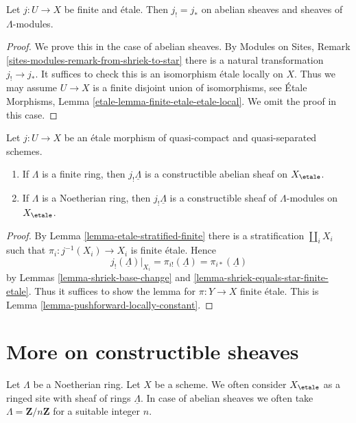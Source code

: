 \begin{lemma}
\label{lemma-shriek-equals-star-finite-etale}
Let $j : U \to X$ be finite and \'etale. Then $j_! = j_*$
on abelian sheaves and sheaves of $\Lambda$-modules.
\end{lemma}

\begin{proof}
We prove this in the case of abelian sheaves.
By Modules on Sites, Remark \ref{sites-modules-remark-from-shriek-to-star}
there is a natural transformation $j_! \to j_*$.
It suffices to check this is an isomorphism \'etale locally
on $X$. Thus we may assume $U \to X$ is a finite disjoint union
of isomorphisms, see
\'Etale Morphisms, Lemma \ref{etale-lemma-finite-etale-etale-local}.
We omit the proof in this case.
\end{proof}

\begin{lemma}
\label{lemma-jshriek-constructible}
Let $j : U \to X$ be an \'etale morphism of quasi-compact and
quasi-separated schemes.
\begin{enumerate}
\item If $\Lambda$ is a finite ring, then $j_!\underline{\Lambda}$ is a
constructible abelian sheaf on $X_\etale$.
\item If $\Lambda$ is a Noetherian ring, then $j_!\underline{\Lambda}$ is a
constructible sheaf of $\Lambda$-modules on $X_\etale$.
\end{enumerate}
\end{lemma}

\begin{proof}
By Lemma \ref{lemma-etale-stratified-finite} there is a stratification
$\coprod_i X_i$ such that $\pi_i: j^{-1}(X_i) \to X_i$ is finite \'etale.
Hence
$$
j_!(\underline{\Lambda})|_{X_i} =
\pi_{i!}(\underline{\Lambda}) =
\pi_{i*}(\underline{\Lambda})
$$
by Lemmas \ref{lemma-shriek-base-change} and
\ref{lemma-shriek-equals-star-finite-etale}.
Thus it suffices to show the lemma for $\pi : Y \to X$ finite \'etale.
This is Lemma \ref{lemma-pushforward-locally-constant}.
\end{proof}








\section{More on constructible sheaves}
\label{section-more-constructible}

\noindent
Let $\Lambda$ be a Noetherian ring. Let $X$ be a scheme.
We often consider $X_\etale$ as a ringed site with
sheaf of rings $\underline{\Lambda}$. In case of abelian sheaves
we often take $\Lambda = \mathbf{Z}/n\mathbf{Z}$ for a suitable
integer $n$.

